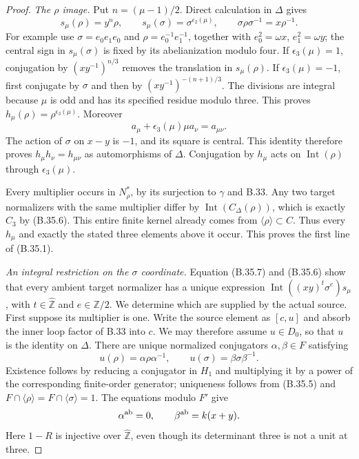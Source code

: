 \begin{proof}
\emph{The $\rho$ image.}
Put $n=(\mu-1)/2$.  Direct calculation in $\Delta$ gives
\[
 s_\mu(\rho)=y^n\rho,\qquad
 s_\mu(\sigma)=\sigma^{\epsilon_2(\mu)},\qquad
 \sigma\rho\sigma^{-1}=x\rho^{-1}.                       \tag{B.35.7}
\]
For example use $\sigma=e_0e_1e_0$ and
$\rho=e_0^{-1}e_1^{-1}$, together with
$e_0^2=\omega x$, $e_1^2=\omega y$; the central sign in
$s_\mu(\sigma)$ is fixed by its abelianization modulo four.
If $\epsilon_3(\mu)=1$, conjugation by
$(xy^{-1})^{n/3}$ removes the translation in $s_\mu(\rho)$.
If $\epsilon_3(\mu)=-1$, first conjugate by $\sigma$ and then
by $(xy^{-1})^{-(n+1)/3}$.  The divisions are integral because
$\mu$ is odd and has its specified residue modulo three.
This proves $h_\mu(\rho)=\rho^{\epsilon_3(\mu)}$.
Moreover
\[
 a_\mu+\epsilon_3(\mu)\mu a_\nu=a_{\mu\nu}.
\]
The action of $\sigma$ on $x-y$ is $-1$, and its square is
central.  This identity therefore proves
$h_\mu h_\nu=h_{\mu\nu}$ as automorphisms of $\Delta$.
Conjugation by $h_\mu$ acts on $\operatorname{Int}(\rho)$
through $\epsilon_3(\mu)$.

Every multiplier occurs in $N_\rho^*$, by its surjection to
$\gamma$ and B.33.  Any two target normalizers with the same
multiplier differ by $\operatorname{Int}(C_\Delta(\rho))$,
which is exactly $C_3$ by (B.35.6).  This entire finite kernel
already comes from $\langle\rho\rangle\subset C$.
Thus every $h_\mu$ and exactly the stated three elements above
it occur.  This proves the first line of (B.35.1).

\emph{An integral restriction on the $\sigma$ coordinate.}
Equation (B.35.7) and (B.35.6) show that every ambient target
normalizer has a unique expression
$\operatorname{Int}((xy)^t\sigma^e)s_\mu$, with
$t\in\widehat{\mathbb Z}$ and $e\in\mathbb Z/2$.
We determine which are supplied by the actual source.
First suppose its multiplier is one.  Write the source element
as $[c,u]$ and absorb the inner loop factor of B.33 into $c$.
We may therefore assume $u\in D_0$, so that $u$ is the identity
on $\Delta$.  There are unique normalized conjugators
$\alpha,\beta\in F$ satisfying
\[
          u(\rho)=\alpha\rho\alpha^{-1},\qquad
          u(\sigma)=\beta\sigma\beta^{-1}.               \tag{B.35.8}
\]
Existence follows by reducing a conjugator in $H_1$ and
multiplying it by a power of the corresponding finite-order
generator; uniqueness follows from (B.35.5) and
$F\cap\langle\rho\rangle=F\cap\langle\sigma\rangle=1$.
The equations modulo $F'$ give
\[
             \alpha^{\rm ab}=0,\qquad
             \beta^{\rm ab}=k(x+y).
\]
Here $1-R$ is injective over $\widehat{\mathbb Z}$, even
though its determinant three is not a unit at three.


\end{proof}
